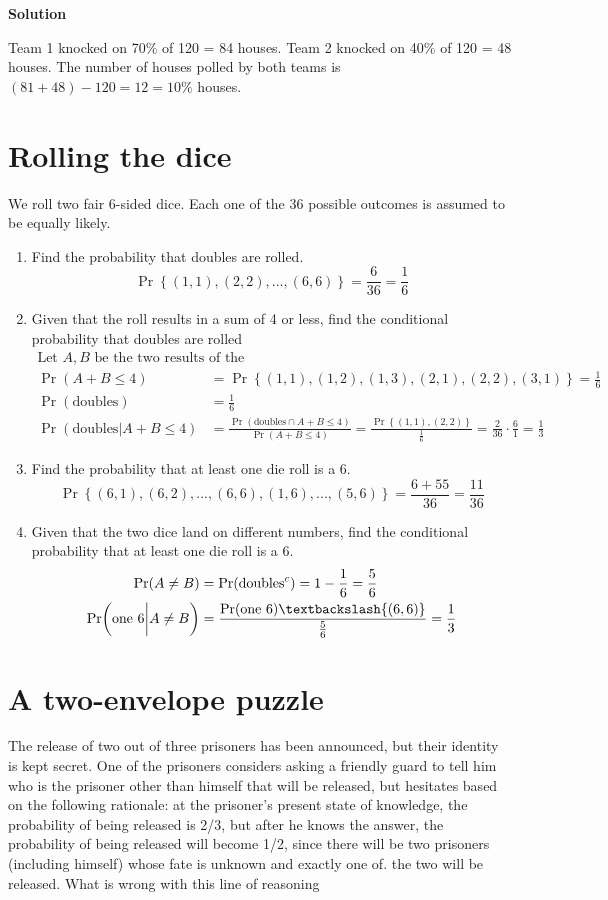\documentclass[12pt]{article}
\begin{document}
\textbf{Solution}

Team 1 knocked on 70\% of 120 = 84 houses.
Team 2 knocked on 40\% of 120 = 48 houses.
The number of houses polled by both teams is $(81+48)-120 = 12 = 10\%$ houses. 

\section{Rolling the dice}
We roll two fair 6-sided dice. Each one of the 36 possible outcomes is assumed to be equally likely.
\begin{enumerate}
    \item Find the probability that doubles are rolled.
    \[ \Pr\left\{(1,1),(2,2),...,(6,6)\right\} = \frac{6}{36} = \frac{1}{6}\]
    \item Given that the roll results in a sum of 4 or less, find the conditional probability that doubles are rolled
    \begin{align*}
        \text{Let $A,B$ be the two results of the die}&
        \\ \Pr(A+B\leq 4) &= \Pr\left\{(1,1),(1,2),(1,3),(2,1),(2,2),(3,1) \right\} = \frac{1}{6}
        \\ \Pr(\text{doubles}) &= \frac{1}{6}
        \\ \Pr(\text{doubles} \bigg| A+B\leq 4) &= \frac{\Pr(\text{doubles} \cap A+B\leq 4)}{\Pr(A+B\leq 4)} 
        = \frac{\Pr\left\{(1,1),(2,2)\right\}}{\frac{1}{6}} 
        = \frac{2}{36} \cdot \frac{6}{1} = \frac{1}{3}
    \end{align*}
    \item Find the probability that at least one die roll is a 6.
    \[ \Pr\left\{(6,1),(6,2),...,(6,6),(1,6),...,(5,6)\right\} = \frac{6+55}{36}=\frac{11}{36}\]
    \item Given that the two dice land on different numbers, find the conditional probability that at least one die
roll is a 6.
    \begin{align*}
        \Pr(A \neq B) &= \Pr(\text{doubles}^c) = 1-\frac{1}{6}=\frac{5}{6}
        \\ \Pr(\text{one 6} \bigg| A \neq B) &= \frac{\Pr(\text{one 6}) \textbackslash \{(6,6)\}}{\frac{5}{6}} = \frac{1}{3}
    \end{align*}
\end{enumerate}

\section{A two-envelope puzzle}
The release of two out of three prisoners has been announced, but their identity is kept secret. One of the
prisoners considers asking a friendly guard to tell him who is the prisoner other than himself that will be
released, but hesitates based on the following rationale: at the prisoner’s present state of knowledge, the
probability of being released is 2/3, but after he knows the answer, the probability of being released will
become 1/2, since there will be two prisoners (including himself) whose fate is unknown and exactly one of.
the two will be released. What is wrong with this line of reasoning
\end{document}
